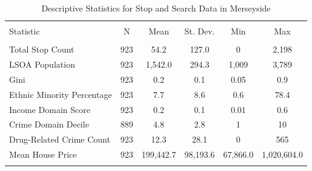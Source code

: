 
\begin{table}[!htbp] \centering 
  \caption{Descriptive Statistics for Stop and Search Data in Merseyside} 
  \label{tab:descriptive_merseyside} 
\begin{tabular}{@{\extracolsep{5pt}}lccccc} 
\\[-1.8ex]\hline 
\hline \\[-1.8ex] 
Statistic & \multicolumn{1}{c}{N} & \multicolumn{1}{c}{Mean} & \multicolumn{1}{c}{St. Dev.} & \multicolumn{1}{c}{Min} & \multicolumn{1}{c}{Max} \\ 
\hline \\[-1.8ex] 
Total Stop Count & 923 & 54.2 & 127.0 & 0 & 2,198 \\ 
LSOA Population & 923 & 1,542.0 & 294.3 & 1,009 & 3,789 \\ 
Gini & 923 & 0.2 & 0.1 & 0.05 & 0.9 \\ 
Ethnic Minority Percentage & 923 & 7.7 & 8.6 & 0.6 & 78.4 \\ 
Income Domain Score & 923 & 0.2 & 0.1 & 0.01 & 0.6 \\ 
Crime Domain Decile & 889 & 4.8 & 2.8 & 1 & 10 \\ 
Drug-Related Crime Count & 923 & 12.3 & 28.1 & 0 & 565 \\ 
Mean House Price & 923 & 199,442.7 & 98,193.6 & 67,866.0 & 1,020,604.0 \\ 
\hline \\[-1.8ex] 
\end{tabular} 
\end{table} 
